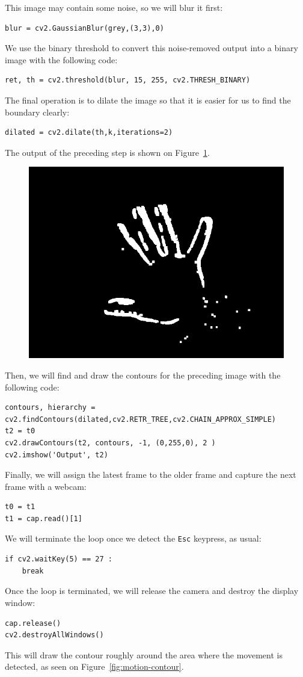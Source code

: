 \documentclass{labo}
\begin{document}
This image may contain some noise, so we will blur it first:
\begin{verbatim}
blur = cv2.GaussianBlur(grey,(3,3),0)
\end{verbatim}
We use the binary threshold to convert this noise-removed output into a binary image with the following code:
\begin{verbatim}
ret, th = cv2.threshold(blur, 15, 255, cv2.THRESH_BINARY)
\end{verbatim}
The final operation is to dilate the image so that it is easier for us to find the boundary clearly:
\begin{verbatim}
dilated = cv2.dilate(th,k,iterations=2)
\end{verbatim}
The output of the preceding step is shown on Figure~\ref{fig:motion-filter}.

\begin{figure}[ht!]
\centering
\includegraphics[width=.7\textwidth]{motion-dilated.png}
\caption{}
\label{fig:motion-filter}
\end{figure}

Then, we will find and draw the contours for the preceding image with the following code:
\begin{verbatim}
contours, hierarchy = cv2.findContours(dilated,cv2.RETR_TREE,cv2.CHAIN_APPROX_SIMPLE)
t2 = t0
cv2.drawContours(t2, contours, -1, (0,255,0), 2 )
cv2.imshow('Output', t2)
\end{verbatim}

Finally, we will assign the latest frame to the older frame and capture the next frame with a webcam:
\begin{verbatim}
t0 = t1
t1 = cap.read()[1]
\end{verbatim}

We will terminate the loop once we detect the \texttt{Esc} keypress, as usual:
\begin{verbatim}
if cv2.waitKey(5) == 27 :
	break
\end{verbatim}
Once the loop is terminated, we will release the camera and destroy the display window:
\begin{verbatim}
cap.release()
cv2.destroyAllWindows()
\end{verbatim}
This will draw the contour roughly around the area where the movement is detected, as seen on Figure~\ref{fig:motion-contour}.
\end{document}
